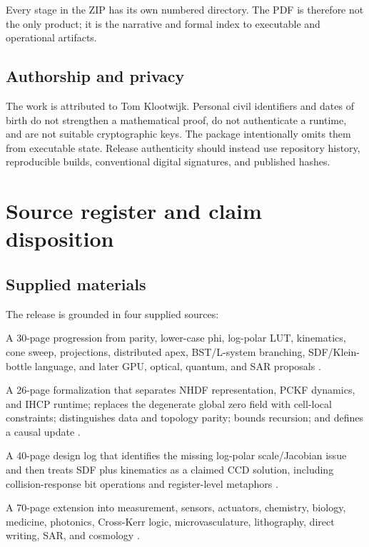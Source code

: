 \documentclass[11pt,a4paper,openany]{book}
\begin{document}
Every stage in the ZIP has its own numbered directory. The PDF is therefore not the only product; it is the narrative and formal index to executable and operational artifacts.

\section{Authorship and privacy}
The work is attributed to Tom Klootwijk. Personal civil identifiers and dates of birth do not strengthen a mathematical proof, do not authenticate a runtime, and are not suitable cryptographic keys. The package intentionally omits them from executable state. Release authenticity should instead use repository history, reproducible builds, conventional digital signatures, and published hashes.

\chapter{Source register and claim disposition}
\section{Supplied materials}
The release is grounded in four supplied sources:
\begin{description}[leftmargin=2.2em,labelindent=0pt,labelsep=0.6em,font=\normalfont\bfseries]
  \item[S1 -- original operator-chain transcript.] A 30-page progression from parity, lower-case phi, log-polar LUT, kinematics, cone sweep, projections, distributed apex, BST/L-system branching, SDF/Klein-bottle language, and later GPU, optical, quantum, and SAR proposals \citep{source_prompt}.
  \item[S2 -- Formal Specification v0.1.] A 26-page formalization that separates NHDF representation, PCKF dynamics, and IHCP runtime; replaces the degenerate global zero field with cell-local constraints; distinguishes data and topology parity; bounds recursion; and defines a causal update \citep{source_formal01}.
  \item[S3 -- commute design transcript.] A 40-page design log that identifies the missing log-polar scale/Jacobian issue and then treats SDF plus kinematics as a claimed CCD solution, including collision-response bit operations and register-level metaphors \citep{source_commute}.
  \item[S4 -- spherical-Cartesian whole-substrate extension.] A 70-page extension into measurement, sensors, actuators, chemistry, biology, medicine, photonics, Cross-Kerr logic, microvasculature, lithography, direct writing, SAR, and cosmology \citep{source_substrate}.
\end{description}
\end{document}
